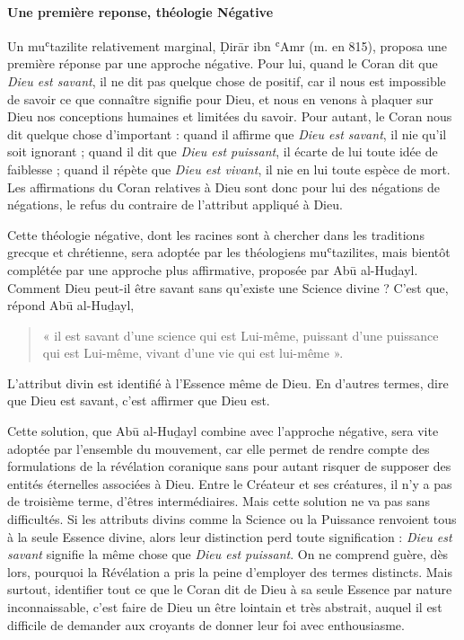 \paragraph{Une première reponse, théologie Négative } Un muʿtazilite relativement marginal, Ḍirār ibn ʿAmr (m. en 815),
proposa une première réponse par une approche négative. Pour lui, quand
le Coran dit que \emph{Dieu est savant}, il ne dit pas quelque chose de
positif, car il nous est impossible de savoir ce que connaître signifie
pour Dieu, et nous en venons à plaquer sur Dieu nos conceptions humaines
et limitées du savoir. Pour autant, le Coran nous dit quelque chose
d'important : quand il affirme que \emph{Dieu est savant}, il nie qu'il
soit ignorant ; quand il dit que \emph{Dieu est puissant}, il écarte de
lui toute idée de faiblesse ; quand il répète que \emph{Dieu est
vivant}, il nie en lui toute espèce de mort. Les affirmations du Coran
relatives à Dieu sont donc pour lui des négations de négations, le refus
du contraire de l'attribut appliqué à Dieu.

Cette théologie négative, dont les racines sont à chercher dans les
traditions grecque et chrétienne, sera adoptée par les théologiens
muʿtazilites, mais bientôt complétée par une approche plus affirmative,
proposée par Abū al-Huḏayl. Comment Dieu peut-il être savant sans
qu'existe une Science divine ? C'est que, répond Abū al-Huḏayl,
\begin{quote}
    « il est
savant d'une science qui est Lui-même, puissant d'une puissance qui est
Lui-même, vivant d'une vie qui est lui-même ».
\end{quote} 
L'attribut divin est
identifié à l'Essence même de Dieu. En d'autres termes, dire que Dieu
est savant, c'est affirmer que Dieu est.

Cette solution, que Abū al-Huḏayl combine avec l'approche négative, sera
vite adoptée par l'ensemble du mouvement, car elle permet de rendre
compte des formulations de la révélation coranique sans pour autant
risquer de supposer des entités éternelles associées à Dieu. Entre le
Créateur et ses créatures, il n'y a pas de troisième terme, d'êtres
intermédiaires. Mais cette solution ne va pas sans difficultés. Si les
attributs divins comme la Science ou la Puissance renvoient tous à la
seule Essence divine, alors leur distinction perd toute signification :
\emph{Dieu est savant} signifie la même chose que \emph{Dieu est
puissant}. On ne comprend guère, dès lors, pourquoi la Révélation a pris
la peine d'employer des termes distincts. Mais surtout, identifier tout
ce que le Coran dit de Dieu à sa seule Essence par nature
inconnaissable, c'est faire de Dieu un être lointain et très abstrait,
auquel il est difficile de
demander aux croyants de donner leur foi avec enthousiasme.

